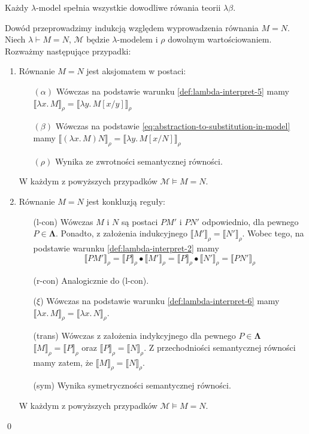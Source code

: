 \begin{twierdzenie}
  Każdy \(\lambda\)-model spełnia wszystkie dowodliwe rówania teorii \(\lambda\beta\).
\end{twierdzenie}
\begin{dowod}
  Dowód przeprowadzimy indukcją względem wyprowadzenia równania \(M=N\).
  Niech \(\lambda \vdash M=N\), \(\mathcal{M}\) będzie \(\lambda\)-modelem i \(\rho\) dowolnym wartościowaniem.
  Rozważmy następujące przypadki:
  \begin{enumerate}
    \setlength\itemsep{0em}
    \item Równanie \(M=N\) jest aksjomatem w postaci:  
      \begin{enumerate}
      \setlength\itemsep{0em}
        \item[\((\alpha)\)] Wówczas na podstawie warunku \ref{def:lambda-interpret-5} mamy
      \(\llbracket\lambda x.\,M\rrbracket_\rho = \llbracket \lambda y.\,M[x/y]\rrbracket_\rho\) 
        \item[\((\beta)\)] Wówczas na podstawie \eqref{eq:abstraction-to-substitution-in-model} mamy
          \(\llbracket(\lambda x.\,M)N\rrbracket_\rho = \llbracket \lambda y.\,M[x/N]\rrbracket_\rho\) 
       \item[\((\rho)\)] Wynika ze zwrotności semantycznej równości.
      \end{enumerate}    
      W każdym z powyższych przypadków \(\mathcal{M}\models M=N\).
    \item Równanie \(M=N\) jest konkluzją reguły:
      \begin{enumerate}
      \setlength\itemsep{0em}
        \item[(l-con)] Wówczas \(M\) i \(N\) są postaci \(PM'\) i \(PN'\) odpowiednio, dla pewnego \(P\in\mathbf{\Lambda}\).
          Ponadto, z założenia indukcyjnego \(\llbracket M' \rrbracket_\rho=\llbracket N' \rrbracket_\rho\).
          Wobec tego, na podstawie warunku \ref{def:lambda-interpret-2} mamy
          \[\llbracket PM'\rrbracket_\rho  =
            \llbracket P\rrbracket_\rho \bullet \llbracket M'\rrbracket_\rho =
            \llbracket P\rrbracket_\rho \bullet \llbracket N'\rrbracket_\rho =
            \llbracket PN'\rrbracket_\rho\]
        \item[(r-con)] Analogicznie do (l-con).
        \item[(\(\xi\))] Wówczas na podstawie warunku \ref{def:lambda-interpret-6} mamy
          \(\llbracket \lambda x.\,M \rrbracket_\rho=\llbracket \lambda x.\,N\rrbracket_\rho\).
        \item[(trans)]
          Wówczas z założenia indykcyjnego dla pewnego \(P\in\mathbf{\Lambda}\)
          \(\llbracket M \rrbracket_\rho = \llbracket P \rrbracket_\rho\) oraz
          \(\llbracket P \rrbracket_\rho=\llbracket N \rrbracket_\rho\).
          Z przechodniości semantycznej równości mamy zatem, że \( \llbracket M \rrbracket_\rho=\llbracket N \rrbracket_\rho\).
        \item[(sym)] Wynika symetryczności semantycznej równości.
      \end{enumerate}
    W każdym z powyższych przypadków \(\mathcal{M}\models M=N\).
  \end{enumerate}
  \qed
\end{dowod}
  
